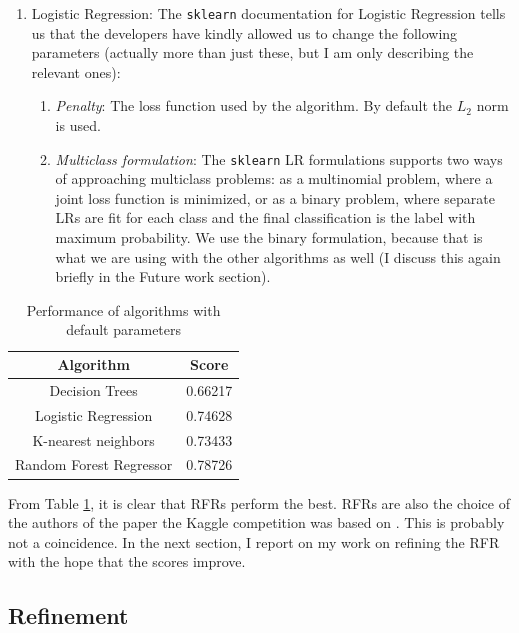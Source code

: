 \documentclass[11pt]{article}
\begin{document}
\begin{enumerate}
\item Logistic Regression: The \texttt{sklearn} documentation for Logistic Regression \cite{lr-documentation} tells us that the developers have kindly allowed us to change the following parameters (actually more than just these, but I am only describing the relevant ones):

\begin{enumerate}
\item \textit{Penalty}: The loss function used by the algorithm. By default the $L_2$ norm is used.
\item \textit{Multiclass formulation}: The \texttt{sklearn} LR formulations supports two ways of approaching multiclass problems: as a multinomial problem, where a joint loss function is minimized, or as a binary problem, where separate LRs are fit for each class and the final classification is the label with maximum probability. We use the binary formulation, because that is what we are using with the other algorithms as well (I discuss this again briefly in the Future work section).
\end{enumerate}

\end{enumerate}

 
 \begin{table}
 \begin{center}
\begin{tabular}{ |c|c| }
\hline
 \textbf{Algorithm} & \textbf{Score}  \\ \hline \hline
 Decision Trees & 0.66217  \\  \hline
 Logistic Regression & 0.74628 \\ \hline    
 K-nearest neighbors & 0.73433 \\ \hline
 Random Forest Regressor & 0.78726	 \\ \hline
\end{tabular}
\caption{Performance of algorithms with default parameters}
\label{tab-scores}
\end{center}
\end{table}

From Table \ref{tab-scores}, it is clear that RFRs perform the best. RFRs are also the choice of the authors of the paper the Kaggle competition was based on \cite{briggs-2012}. This is probably not a coincidence. In the next section, I report on my work on refining the RFR with the hope that the scores improve.

\subsection{Refinement}
\label{sec-refinement}
\end{document}

